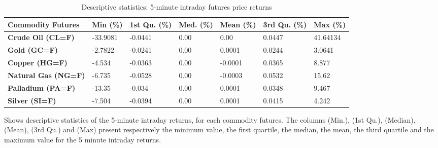\begin{landscape}
\begin{table}[]
\begin{center}
\caption{Descriptive statistics: 5-minute intraday futures price returns}
\label{tab:stat4}
\begin{tabular}{@{}lllllll@{}}
\toprule
\textbf{Commodity Futures}  & \textbf{Min (\%)} & \textbf{1st Qu. (\%)} & \textbf{Med. (\%)} & \textbf{Mean (\%)} & \textbf{3rd Qu. (\%)} & \textbf{Max (\%)} \\ \midrule
\textbf{Crude Oil (CL=F)}   & -33.9081          & -0.0441               & 0.00               & 0.00             & 0.0447                & 41.64134        \\
\textbf{Gold (GC=F)}        & -2.7822           & -0.0241               & 0.00               & 0.0001             & 0.0244                & 3.0641         \\
\textbf{Copper (HG=F)}      & -4.534           & -0.0363               & 0.00               & -0.0001            & 0.0365                & 8.877         \\
\textbf{Natural Gas (NG=F)} & -6.735           & -0.0528               & 0.00               & -0.0003            & 0.0532                & 15.62        \\
\textbf{Palladium (PA=F)}   & -13.35          & -0.034               & 0.00               & 0.0001             & 0.0348                & 9.467         \\
\textbf{Silver (SI=F)}      & -7.504           & -0.0394               & 0.00               & 0.0001             & 0.0415                & 4.242         \\ \bottomrule
\end{tabular}
\end{center}
\begin{tablenotes}
        \singlespacing
        \footnotesize
Shows descriptive statistics of the 5-minute intraday returns, for each commodity futures. The columns (Min.), (1st Qu.), (Median), (Mean), (3rd Qu.) and (Max) present respectively the minimum value, the first quartile, the median, the mean, the third quartile and the maximum value for the 5 minute intraday returns.
\end{tablenotes}
\end{table}
\end{landscape}



